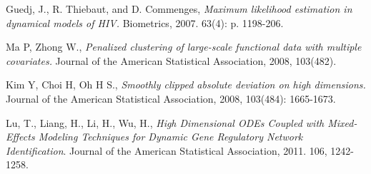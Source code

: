 \documentclass[12pt]{extarticle}
\begin{document}
\begin{thebibliography}{9}
Guedj, J., R. Thiebaut, and D. Commenges, 
\emph{Maximum likelihood estimation in dynamical models of HIV.} 
Biometrics, 2007. 63(4): p. 1198-206.

Ma P, Zhong W., 
\emph{Penalized clustering of large-scale functional data with multiple covariates.} 
Journal of the American Statistical Association, 2008, 103(482).

Kim Y, Choi H, Oh H S., 
\emph{Smoothly clipped absolute deviation on high dimensions.} 
Journal of the American Statistical Association, 2008, 103(484): 1665-1673.

Lu, T., Liang, H., Li, H., Wu, H., 
\emph{High Dimensional ODEs Coupled with Mixed-Effects Modeling Techniques for Dynamic Gene Regulatory Network Identification}. 
Journal of the American Statistical Association, 2011. 106, 1242-1258.

\end{thebibliography}
\end{document}
